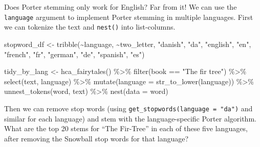 \documentclass[
]{krantz}
\makeatletter
\newenvironment{Shaded}{\begin{snugshade}}{\end{snugshade}}
\newcommand{\AttributeTok}[1]{\textcolor[rgb]{0.77,0.63,0.00}{#1}}
\newcommand{\FunctionTok}[1]{\textcolor[rgb]{0.00,0.00,0.00}{#1}}
\newcommand{\NormalTok}[1]{#1}
\newcommand{\OtherTok}[1]{\textcolor[rgb]{0.56,0.35,0.01}{#1}}
\newcommand{\SpecialCharTok}[1]{\textcolor[rgb]{0.00,0.00,0.00}{#1}}
\newcommand{\StringTok}[1]{\textcolor[rgb]{0.31,0.60,0.02}{#1}}
\newenvironment{kframe}{%
\medskip{}
\setlength{\fboxsep}{.8em}
 \def\at@end@of@kframe{}%
 \ifinner\ifhmode%
  \def\at@end@of@kframe{\end{minipage}}%
  \begin{minipage}{\columnwidth}%
 \fi\fi%
 \def\FrameCommand##1{\hskip\@totalleftmargin \hskip-\fboxsep
 \colorbox{shadecolor}{##1}\hskip-\fboxsep
     \hskip-\linewidth \hskip-\@totalleftmargin \hskip\columnwidth}%
 \MakeFramed {\advance\hsize-\width
   \@totalleftmargin\z@ \linewidth\hsize
   \@setminipage}}%
 {\par\unskip\endMakeFramed%
 \at@end@of@kframe}
\renewenvironment{Shaded}{\begin{kframe}}{\end{kframe}}
\makeatother
\begin{document}
Does Porter stemming only work for English? Far from it! We can use the \texttt{language} argument to implement Porter stemming in multiple languages. First we can tokenize the text and \texttt{nest()} into list-columns.

\begin{Shaded}
\begin{Highlighting}[]
\NormalTok{stopword\_df }\OtherTok{\textless{}{-}} \FunctionTok{tribble}\NormalTok{(}\SpecialCharTok{\textasciitilde{}}\NormalTok{language, }\SpecialCharTok{\textasciitilde{}}\NormalTok{two\_letter,}
                       \StringTok{"danish"}\NormalTok{,  }\StringTok{"da"}\NormalTok{,}
                       \StringTok{"english"}\NormalTok{, }\StringTok{"en"}\NormalTok{,}
                       \StringTok{"french"}\NormalTok{,  }\StringTok{"fr"}\NormalTok{,}
                       \StringTok{"german"}\NormalTok{,  }\StringTok{"de"}\NormalTok{,}
                       \StringTok{"spanish"}\NormalTok{, }\StringTok{"es"}\NormalTok{)}

\NormalTok{tidy\_by\_lang }\OtherTok{\textless{}{-}} \FunctionTok{hca\_fairytales}\NormalTok{() }\SpecialCharTok{\%\textgreater{}\%}
  \FunctionTok{filter}\NormalTok{(book }\SpecialCharTok{==} \StringTok{"The fir tree"}\NormalTok{) }\SpecialCharTok{\%\textgreater{}\%}
  \FunctionTok{select}\NormalTok{(text, language) }\SpecialCharTok{\%\textgreater{}\%}
  \FunctionTok{mutate}\NormalTok{(}\AttributeTok{language =} \FunctionTok{str\_to\_lower}\NormalTok{(language)) }\SpecialCharTok{\%\textgreater{}\%}
  \FunctionTok{unnest\_tokens}\NormalTok{(word, text) }\SpecialCharTok{\%\textgreater{}\%}
  \FunctionTok{nest}\NormalTok{(}\AttributeTok{data =}\NormalTok{ word)}
\end{Highlighting}
\end{Shaded}

Then we can remove stop words (using \texttt{get\_stopwords(language\ =\ "da")} and similar for each language) and stem with the language-specific Porter algorithm. What are the top 20 stems for ``The Fir-Tree'' in each of these five languages, after removing the Snowball stop words for that language?
\end{document}
